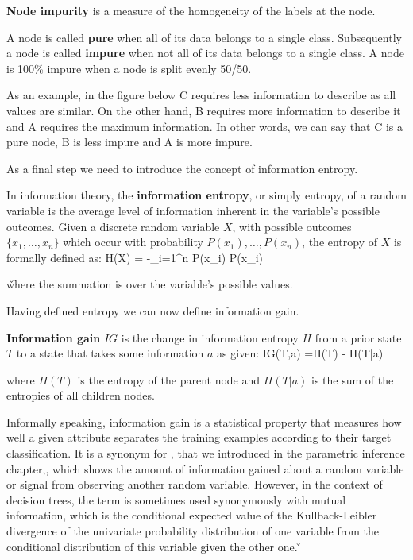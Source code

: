 \textbf{Node impurity} is a measure of the homogeneity of the labels at the node.
\ed

A node is called \textbf{pure} when all of its data belongs to a single class. Subsequently a node is called
\textbf{impure} when not all of its data belongs to a single class. A node is 100\% impure when a node is split
evenly 50/50.
\ed

\be
As an example, in the figure below C requires less information to describe as all values are similar. On the other
hand, B requires more information to describe it and A requires the maximum information. In other words, we can say
that C is a pure node, B is less impure and A is more impure.

\ee

As a final step we need to introduce the concept of information entropy.

In information theory, the \textbf{information entropy}, or simply entropy, of a random variable is the average level
of information inherent in the variable's possible outcomes. Given a discrete random variable $X$, with possible
outcomes $\{x_{1}, \ldots, x_{n} \}$ which occur with probability $ P(x_{1}), \ldots, P (x_{n})$, the entropy of $X$
is formally defined as:
\bse
H(X) = -\sum _{i=1}^{n} {P(x_{i}) \log P(x_{i})}
\ese

\v

where the summation is over the variable's possible values.
\ed

Having defined entropy we can now define information gain.

\textbf{Information gain} $IG$ is the change in information entropy $H$ from a prior state $T$ to a state that takes
some information $a$ as given:
\bse
IG(T,a) =H(T) - H(T|a)
\ese

where $H(T)$ is the entropy of the parent node and $H(T|a)$ is the sum of the entropies of all children nodes.
\ed

Informally speaking, information gain is a statistical property that measures how well a given attribute separates
the training examples according to their target classification. It is a synonym for , that we introduced in the parametric inference chapter,, which shows the amount of information gained
about a random variable or signal from observing another random variable. However, in the context of decision trees,
the term is sometimes used synonymously with mutual information, which is the conditional expected value of the
Kullback-Leibler divergence of the univariate probability distribution of one variable from the conditional
distribution of this variable given the other one. \v

